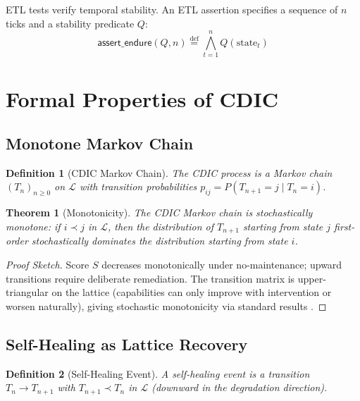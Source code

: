 \documentclass[11pt,a4paper]{article}
\newtheorem{theorem}{Theorem}
\newtheorem{definition}{Definition}
\begin{document}
ETL tests verify temporal stability.  An ETL assertion specifies a sequence of $n$
ticks and a stability predicate $Q$:
\[
  \mathsf{assert\_endure}(Q, n) \stackrel{\text{def}}{=}
  \bigwedge_{t=1}^{n} Q(\text{state}_t)
\]

\section{Formal Properties of CDIC}
\label{sec:formal}

\subsection{Monotone Markov Chain}

\begin{definition}[CDIC Markov Chain]
The CDIC process is a Markov chain $(T_n)_{n \ge 0}$ on $\mathcal{L}$ with transition
probabilities $p_{ij} = P(T_{n+1} = j \mid T_n = i)$.
\end{definition}

\begin{theorem}[Monotonicity]
\label{thm:mono}
The CDIC Markov chain is stochastically monotone: if $i \prec j$ in $\mathcal{L}$,
then the distribution of $T_{n+1}$ starting from state $j$ first-order stochastically
dominates the distribution starting from state $i$.
\end{theorem}

\begin{proof}[Proof Sketch]
Score $S$ decreases monotonically under no-maintenance; upward transitions require
deliberate remediation.  The transition matrix is upper-triangular on the lattice
(capabilities can only improve with intervention or worsen naturally), giving
stochastic monotonicity via standard results \cite{lindvall1992lectures}.
\end{proof}

\subsection{Self-Healing as Lattice Recovery}

\begin{definition}[Self-Healing Event]
A \emph{self-healing event} is a transition $T_n \to T_{n+1}$ with
$T_{n+1} \prec T_n$ in $\mathcal{L}$ (downward in the degradation direction).
\end{definition}
\end{document}

